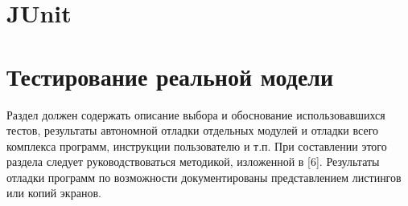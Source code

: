 \section{JUnit}
\section{Тестирование реальной модели}
Раздел должен содержать описание выбора и обоснование
использовавшихся тестов, результаты автономной отладки отдельных модулей и отладки всего
комплекса программ, инструкции пользователю и т.п. При составлении этого раздела следует
руководствоваться методикой, изложенной в [6]. Результаты отладки программ по возможности
документированы представлением листингов или копий экранов.